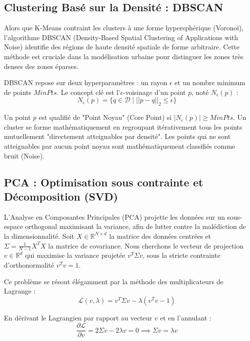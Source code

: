 \documentclass[11pt,a4paper,twoside]{report}
\begin{document}
\subsection{Clustering Basé sur la Densité : DBSCAN}

Alors que K-Means contraint les clusters à une forme hypersphérique (Voronoï), l'algorithme DBSCAN (Density-Based Spatial Clustering of Applications with Noise) \cite{ester1996} identifie des régions de haute densité spatiale de forme arbitraire. Cette méthode est cruciale dans la modélisation urbaine pour distinguer les zones très denses des zones éparses.

DBSCAN repose sur deux hyperparamètres : un rayon $\epsilon$ et un nombre minimum de points $MinPts$. Le concept clé est l'$\epsilon$-voisinage d'un point $p$, noté $N_\epsilon(p)$ :
\begin{equation}
N_\epsilon(p) = \{q \in \mathcal{D} \mid ||p - q||_2 \le \epsilon\}
\end{equation}

Un point $p$ est qualifié de "Point Noyau" (Core Point) si $|N_\epsilon(p)| \ge MinPts$. Un cluster se forme mathématiquement en regroupant itérativement tous les points mutuellement "directement atteignables par densité". Les points qui ne sont atteignables par aucun point noyau sont mathématiquement classifiés comme bruit (Noise).

\subsection{PCA : Optimisation sous contrainte et Décomposition (SVD)}

L'Analyse en Composantes Principales (PCA) \cite{jolliffe2002} projette les données sur un sous-espace orthogonal maximisant la variance, afin de lutter contre la malédiction de la dimensionnalité. Soit $X \in \mathbb{R}^{N \times d}$ la matrice des données centrées et $\Sigma = \frac{1}{N-1}X^T X$ la matrice de covariance. Nous cherchons le vecteur de projection $v \in \mathbb{R}^d$ qui maximise la variance projetée $v^T \Sigma v$, sous la stricte contrainte d'orthonormalité $v^T v = 1$. 

Ce problème se résout élégamment par la méthode des multiplicateurs de Lagrange :
\begin{equation}
\mathcal{L}(v, \lambda) = v^T \Sigma v - \lambda (v^T v - 1)
\end{equation}

En dérivant le Lagrangien par rapport au vecteur $v$ et en l'annulant :
\begin{equation}
\frac{\partial \mathcal{L}}{\partial v} = 2 \Sigma v - 2 \lambda v = 0 \implies \Sigma v = \lambda v
\end{equation}
\end{document}
